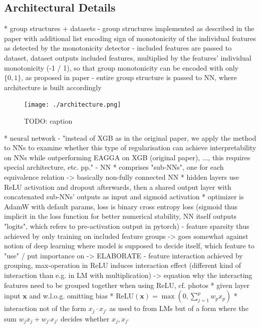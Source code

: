 \documentclass[twoside,11pt]{article}
\begin{document}
\subsection{Architectural Details}
  * group structures + datasets
    - group structures implemented as described in the paper with additional list encoding sign of monotonicity of the individual features as detected by the
      monotonicity detector
    - included features are passed to dataset, dataset outputs included features, multiplied by the features' individual monotonicity (-1 / 1), so that group monotonicity
      can be encoded with only $\{0,1\}$, as proposed in paper
    - entire group structure is passed to NN, where architecture is built accordingly
\begin{figure}
  \centering
  \texttt{[image: ./architecture.png]}  %
  \caption{TODO: caption}
  \label{fig-nn-architecture}
\end{figure}
  * neural network
    - "instead of XGB as in the original paper, we apply the method to NNs to examine whether this type of regularisation can achieve interpretability on NNs while
      outperforming EAGGA on XGB (original paper), ..., this requires special architecture, etc. pp."
    - NN
      * comprises "sub-NNs", one for each equivalence relation -> basically non-fully connected NN
      * hidden layers use ReLU activation and dropout afterwards, then a shared output layer with concatenated sub-NNs' outputs as input and sigmoid activation
      * optimizer is AdamW with default params, loss is binary cross entropy loss (sigmoid thus implicit in the loss function for better numerical stability,
        NN itself outputs "logits", which refers to pre-activation output in pytorch)
    - feature sparsity thus achieved by only training on included feature groups -> goes somewhat against notion of deep learning where model is supposed to decide itself,
      which feature to "use" / put importance on -> ELABORATE
    - feature interaction achieved by grouping, max-operation in ReLU induces interaction effect (different kind of interaction than e.g. in LM with multiplication)
      -> equation why the interacting features need to be grouped together when using ReLU, cf. photos
      * given layer input $\boldsymbol{x}$ and w.l.o.g. omitting bias
      * $\text{ReLU}(\boldsymbol{x})=\max(0,\sum_{j=1}^p w_p x_p)$
      * interaction not of the form $x_j \cdot x_{j'}$ as used to from LMs but of a form where the sum $w_j x_j+w_{j'} x_{j'}$ decides whether $x_j,x_{j'}$
\end{document}
